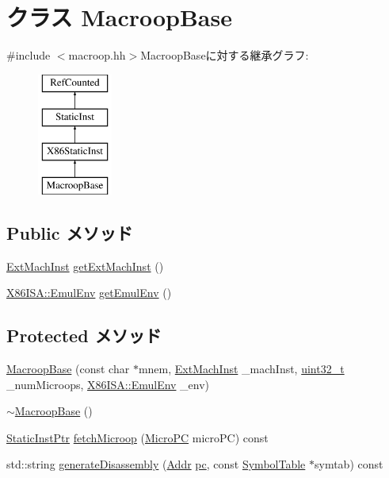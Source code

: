 \hypertarget{classX86ISA_1_1MacroopBase}{
\section{クラス MacroopBase}
\label{classX86ISA_1_1MacroopBase}
}


{\ttfamily \#include $<$macroop.hh$>$}MacroopBaseに対する継承グラフ:\begin{figure}[H]
\begin{center}
\leavevmode
\includegraphics[height=4cm]{classX86ISA_1_1MacroopBase}
\end{center}
\end{figure}
\subsection*{Public メソッド}
\begin{DoxyCompactItemize}
\item 
\hyperlink{structX86ISA_1_1ExtMachInst}{ExtMachInst} \hyperlink{classX86ISA_1_1MacroopBase_ae1f54d17eef66872a0472678ae93adce}{getExtMachInst} ()
\item 
\hyperlink{structX86ISA_1_1EmulEnv}{X86ISA::EmulEnv} \hyperlink{classX86ISA_1_1MacroopBase_acb5d989461a0c60d083cf4313557d904}{getEmulEnv} ()
\end{DoxyCompactItemize}
\subsection*{Protected メソッド}
\begin{DoxyCompactItemize}
\item 
\hyperlink{classX86ISA_1_1MacroopBase_a7b5ebb60c18e9cda121310bce07adaad}{MacroopBase} (const char $\ast$mnem, \hyperlink{structX86ISA_1_1ExtMachInst}{ExtMachInst} \_\-machInst, \hyperlink{Type_8hh_a435d1572bf3f880d55459d9805097f62}{uint32\_\-t} \_\-numMicroops, \hyperlink{structX86ISA_1_1EmulEnv}{X86ISA::EmulEnv} \_\-env)
\item 
\hyperlink{classX86ISA_1_1MacroopBase_a9647fe604d618e84ec3bdb7f1f3a887f}{$\sim$MacroopBase} ()
\item 
\hyperlink{classRefCountingPtr}{StaticInstPtr} \hyperlink{classX86ISA_1_1MacroopBase_ae9e7acd6304ee397f1ab470e283ae76b}{fetchMicroop} (\hyperlink{base_2types_8hh_adfb4d8b20c5abc8be73dd367b16f2d57}{MicroPC} microPC) const 
\item 
std::string \hyperlink{classX86ISA_1_1MacroopBase_a95d323a22a5f07e14d6b4c9385a91896}{generateDisassembly} (\hyperlink{base_2types_8hh_af1bb03d6a4ee096394a6749f0a169232}{Addr} \hyperlink{namespaceX86ISA_aecb63c74e066ecd98e04d057e39028c9}{pc}, const \hyperlink{classSymbolTable}{SymbolTable} $\ast$symtab) const 
\end{DoxyCompactItemize}
